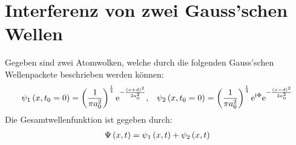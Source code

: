 \documentclass[11pt, ngerman, fleqn, DIV=15, headinclude]{scrartcl}
\begin{document}
\section{Interferenz von zwei Gauss'schen Wellen}

Gegeben sind zwei Atomwolken, welche durch die folgenden Gauss'schen Wellenpackete beschrieben werden können:
\begin{align*}
		\psi_1\left( x,t_0=0 \right)=\left( \frac1{\pi a_0^2} \right)^{\frac14}\mathrm e^{-\frac{\left( x+d \right)^2}{2a_0^2}},&&\psi_2\left( x,t_0=0 \right)=\left( \frac1{\pi a_0^2} \right)^{\frac14}\mathrm e^{\mathrm i\Phi}\mathrm e^{-\frac{\left( x-d \right)^2}{2a_0^2}}
\end{align*}
Die Gesamtwellenfunktion ist gegeben durch:
\begin{align*}
	\Psi\left( x,t \right)=\psi_1\left( x,t \right)+\psi_2\left( x,t \right)
\end{align*}

\subsection{}
\end{document}
